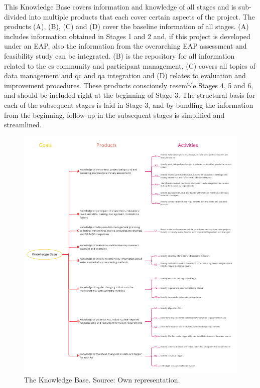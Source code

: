 This Knowledge Base covers information and knowledge of all stages and is sub-divided into multiple products that each cover certain aspects of the project. The products (A), (B), (C) and (D) cover the baseline information of all stages. (A) includes information obtained in Stages 1 and 2 and, if this project is developed under an EAP, also the information from the overarching EAP assessment and feasibility study can be integrated. (B) is the repository for all information related to the \acrlong{cs} community and participant management, (C) covers all topics of data management and \acrshort{qc} and \acrshort{qa} integration and (D) relates to evaluation and improvement procedures. These products consciously resemble Stages 4, 5 and 6, and should be included right at the beginning of Stage 3. The structural basis for each of the subsequent stages is laid in Stage 3, and by bundling the information from the beginning, follow-up in the subsequent stages is simplified and streamlined.\newline
\begin{figure}[!hp]
    \centering
    \includegraphics[width=1.0\textwidth]{figures/2023_MA_results_knowledge.pdf}
    \decoRule
    \caption[PRC: The Knowledge Base]{The Knowledge Base. Source: Own representation.}
    \label{fig:res_knowledge}
\end{figure}
